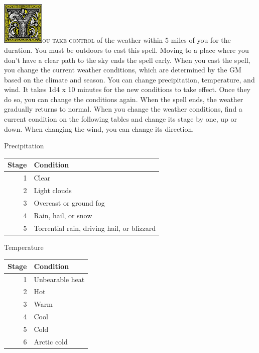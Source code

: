 \documentclass[12pt,showtrims]{memoir}
\begin{document}
\vspace{1\baselineskip}\noindent
\lettrine[lines=4]{\includegraphics[height=58pt]{initials/Y.png}}{ou take control} of the weather within 5 miles of you for the duration. You must be outdoors to cast this spell. Moving to a place where you don't have a clear path to the sky ends the spell early. When you cast the spell, you change the current weather conditions, which are determined by the GM based on the climate and season. You can change precipitation, temperature, and wind. It takes 1d4 x 10 minutes for the new conditions to take effect. Once they do so, you can change the conditions again. When the spell ends, the weather gradually returns to normal. When you change the weather conditions, find a current condition on the following tables and change its stage by one, up or down. When changing the wind, you can change its direction.
\begin{table}[H]
\centering
Precipitation\\[1pt]
\begin{tabular}{rl}
    \toprule
        Stage & Condition \\
    \midrule
        1  & Clear  \\
        2  & Light clouds \\
        3  & Overcast or ground fog \\
        4  & Rain, hail, or snow \\
        5  & Torrential rain, driving hail, or blizzard \\
    \bottomrule
\end{tabular}
\end{table}

\begin{table}[H]
\centering
Temperature\\[1pt]
\begin{tabular}{rl}
    \toprule
        Stage & Condition \\
    \midrule
      1 & Unbearable heat \\
      2 & Hot \\
      3 & Warm  \\
      4 & Cool  \\
      5 & Cold  \\
      6 & Arctic cold \\
    \bottomrule
\end{tabular}
\end{table}
\end{document}
